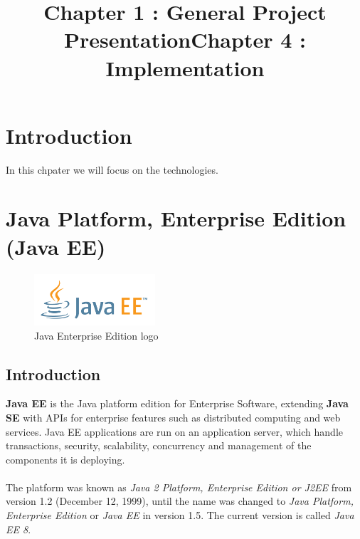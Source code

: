 \documentclass[12pt]{article}
\begin{document}
\listoffigures

	\title{Chapter 1 : General Project Presentation}

	
\title{Chapter 4 : Implementation}
\maketitle
	\section{Introduction}
	
	In this chpater we will focus on the technologies. 
	\section{Java Platform, Enterprise Edition (Java EE)}
		\begin{figure}[h]
		\centering
		\includegraphics[width=0.4\textwidth]{JAVAEE_logo.png}
		\caption{Java Enterprise Edition logo}
		
	    \end{figure}

\subsection{Introduction}
\textbf{Java EE} is the Java platform edition for Enterprise Software, extending \textbf{Java SE} with APIs for enterprise features such as distributed computing and web services. Java EE applications are run on an application server, which handle transactions, security, scalability, concurrency and management of the components it is deploying.
\\
\\
The platform was known as \textit{Java 2 Platform, Enterprise Edition or J2EE} from version 1.2 (December 12, 1999), until the name was changed to \textit{Java Platform, Enterprise Edition} or \textit{Java EE} in version 1.5. The current version is called \textit{Java EE 8}.
\end{document}
